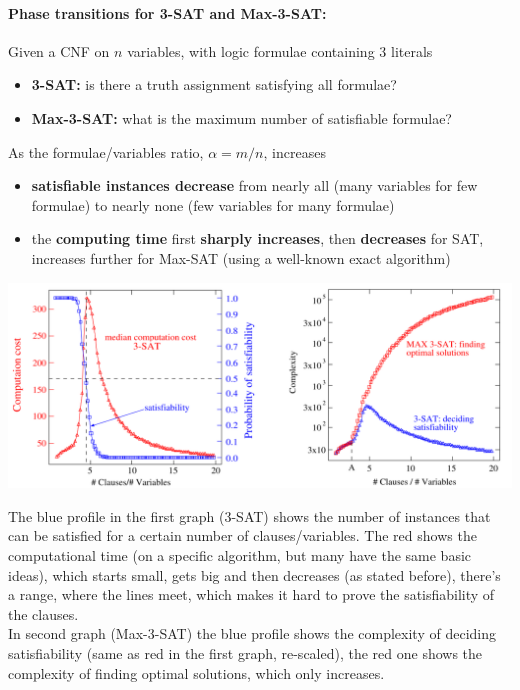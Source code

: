 \documentclass[11pt]{article}
\begin{document}
	\paragraph{Phase transitions for 3-SAT and Max-3-SAT:} Given a CNF on $n$ variables, with logic formulae containing $3$ literals
	\begin{itemize}
		\item \textbf{3-SAT:} is there a truth assignment satisfying all formulae?
		\item \textbf{Max-3-SAT:} what is the maximum number of satisfiable formulae?
	\end{itemize}
	As the formulae/variables ratio, $\alpha = m/n$, increases
	\begin{itemize}
		\item \textbf{satisfiable instances decrease} from nearly all (many variables for few formulae) to nearly none (few variables for many formulae)
		\item the \textbf{computing time} first \textbf{sharply increases}, then \textbf{decreases} for SAT, increases further for Max-SAT (using a well-known exact algorithm)
	\end{itemize}
	\begin{center}
		\includegraphics[width=\columnwidth]{img/PhaseT1}
	\end{center}
	The blue profile in the first graph (3-SAT) shows the number of instances that can be satisfied for a certain number of clauses/variables. The red shows the computational time (on a specific algorithm, but many have the same basic ideas), which starts small, gets big and then decreases (as stated before), there's a range, where the lines meet, which makes it hard to prove the satisfiability of the clauses.\\
	
	In second graph (Max-3-SAT) the blue profile shows the complexity of deciding satisfiability (same as red in the first graph, re-scaled), the red one shows the complexity of finding optimal solutions, which only increases.\\
	
\end{document}
